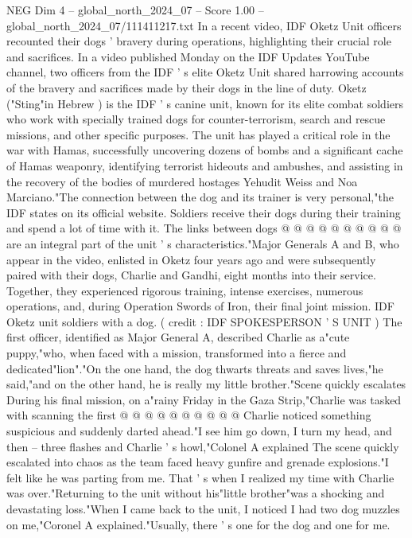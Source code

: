 \begin{textsample}{NEG Dim 4 – global\_north\_2024\_07 – Score 1.00 – global\_north\_2024\_07/111411217.txt}  \label{ex:f4_neg_267}
In a recent video, IDF Oketz Unit officers recounted their dogs ' bravery during operations, highlighting their crucial role and sacrifices.
In a video published Monday on the IDF Updates YouTube channel, two officers from the IDF ' s elite Oketz Unit shared harrowing accounts of the bravery and sacrifices made by their dogs in the line of duty.
Oketz ("Sting"in Hebrew ) is the IDF ' s canine unit, known for its elite combat soldiers who work with specially trained dogs for counter-terrorism, search and rescue missions, and other specific purposes.
The unit has played a critical role in the war with Hamas, successfully uncovering dozens of bombs and a significant cache of Hamas weaponry, identifying terrorist hideouts and ambushes, and assisting in the recovery of the bodies of murdered hostages Yehudit Weiss and Noa Marciano."The connection between the dog and its trainer is very personal,"the IDF states on its official website.
Soldiers receive their dogs during their training and spend a lot of time with it.
The links between dogs @ @ @ @ @ @ @ @ @ @ are an integral part of the unit ' s characteristics."Major Generals A and B, who appear in the video, enlisted in Oketz four years ago and were subsequently paired with their dogs, Charlie and Gandhi, eight months into their service.
Together, they experienced rigorous training, intense exercises, numerous operations, and, during Operation Swords of Iron, their final joint mission.
IDF Oketz unit soldiers with a dog. ( credit : IDF SPOKESPERSON ' S UNIT ) The first officer, identified as Major General A, described Charlie as a"cute puppy,"who, when faced with a mission, transformed into a fierce and dedicated"lion"."On the one hand, the dog thwarts threats and saves lives,"he said,"and on the other hand, he is really my little brother."Scene quickly escalates During his final mission, on a"rainy Friday in the Gaza Strip,"Charlie was tasked with scanning the first @ @ @ @ @ @ @ @ @ @ Charlie noticed something suspicious and suddenly darted ahead."I see him go down, I turn my head, and then -- three flashes and Charlie ' s howl,"Colonel A explained The scene quickly escalated into chaos as the team faced heavy gunfire and grenade explosions."I felt like he was parting from me.
That ' s when I realized my time with Charlie was over."Returning to the unit without his"little brother"was a shocking and devastating loss."When I came back to the unit, I noticed I had two dog muzzles on me,"Coronel A explained."Usually, there ' s one for the dog and one for me.

\end{textsample}
